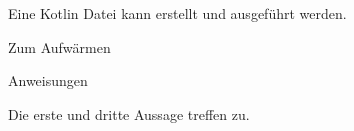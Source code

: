 \begin{solution}
    Eine Kotlin Datei kann erstellt und ausgeführt werden.
\end{solution}
\begin{task}[points=auto]{Zum Aufwärmen }
    \begin{subtask*}[points=0]{Anweisungen}
        \begin{itemize}
            \mchead
        \end{itemize}

        \begin{solution}
            Die erste und dritte Aussage treffen zu.
        \end{solution}
    \end{subtask*}
\end{task}

